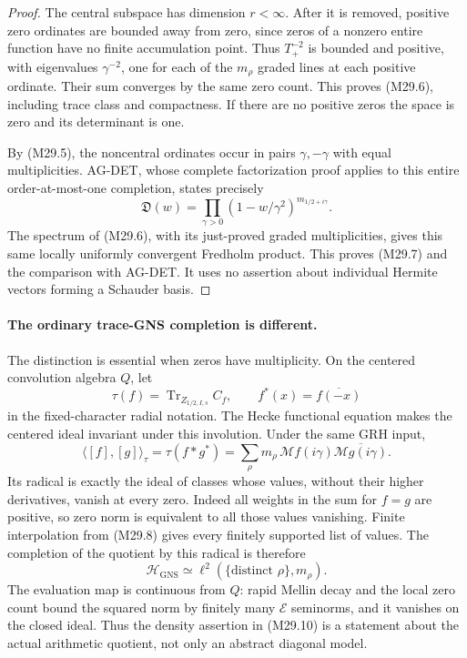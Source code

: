 \begin{proof}
The central subspace has dimension \(r<\infty\).
After it is removed, positive zero ordinates
are bounded away from zero, since zeros of a
nonzero entire function have no finite accumulation
point. Thus \(T_+^{-2}\) is bounded and positive,
with eigenvalues \(\gamma^{-2}\), one for each of
the \(m_\rho\) graded lines at each positive
ordinate. Their sum converges by the same
zero count. This proves (M29.6), including trace
class and compactness. If there are no positive
zeros the space is zero and its determinant is one.

By (M29.5), the noncentral ordinates occur in
pairs \(\gamma,-\gamma\) with equal multiplicities.
AG-DET, whose complete factorization proof
applies to this entire order-at-most-one
completion, states precisely
\[
        \mathfrak D(w)=
          \prod_{\gamma>0}(1-w/\gamma^2)^{m_{1/2+i\gamma}}.
 \]
The spectrum of (M29.6), with its just-proved
graded multiplicities, gives this same locally
uniformly convergent Fredholm product.
This proves (M29.7) and the comparison with
AG-DET. It uses no assertion about individual
Hermite vectors forming a Schauder basis.
\end{proof}

\paragraph{The ordinary trace-GNS completion is different.}
The distinction is essential when zeros have multiplicity.
On the centered convolution algebra \(Q\), let
\[
       \tau(f)=\operatorname{Tr}_{Z_{1/2,I,s}}C_f,\qquad
       f^*(x)=\overline{f(-x)}
 \]
in the fixed-character radial notation. The Hecke
functional equation makes the centered ideal invariant
under this involution. Under the same GRH input,
\[
 \langle[f],[g]\rangle_\tau
          =\tau(f*g^*)
          =\sum_{\rho}m_\rho\,
                    \mathcal Mf(i\gamma)
                        \overline{\mathcal Mg(i\gamma)} .
                                                               \tag{M29.9}
\]
Its radical is exactly the ideal of classes whose
values, without their higher derivatives, vanish at
every zero. Indeed all weights in the sum for
\(f=g\) are positive, so zero norm is equivalent
to all those values vanishing. Finite interpolation
from (M29.8) gives every finitely supported list
of values. The completion of the quotient by
this radical is therefore
\[
       \mathcal H_{\mathrm{GNS}}
             \simeq\ell^2(\{\text{distinct }\rho\},m_\rho).
                                                               \tag{M29.10}
\]
The evaluation map is continuous from \(Q\):
rapid Mellin decay and the local zero count
bound the squared norm by finitely many
\(\mathcal E\) seminorms, and it vanishes on
the closed ideal. Thus the density assertion
in (M29.10) is a statement about the actual
arithmetic quotient, not only an abstract
diagonal model.

